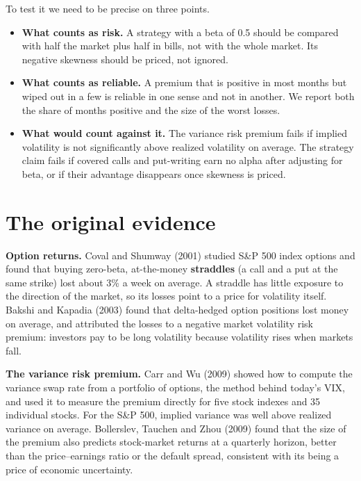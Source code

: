 To test it we need to be precise on three points.

\begin{itemize}
  \item \textbf{What counts as risk.} A strategy with a beta of 0.5 should be compared with half the market plus half in bills, not with the whole market. Its negative skewness should be priced, not ignored.
  \item \textbf{What counts as reliable.} A premium that is positive in most months but wiped out in a few is reliable in one sense and not in another. We report both the share of months positive and the size of the worst losses.
  \item \textbf{What would count against it.} The variance risk premium fails if implied volatility is not significantly above realized volatility on average. The strategy claim fails if covered calls and put-writing earn no alpha after adjusting for beta, or if their advantage disappears once skewness is priced.
\end{itemize}

\section{The original evidence}
\label{sec:14-evidence}

\textbf{Option returns.} Coval and Shumway (2001) studied S\&P 500 index options and found that buying zero-beta, at-the-money \textbf{straddles} (a call and a put at the same strike) lost about 3\% a week on average. A straddle has little exposure to the direction of the market, so its losses point to a price for volatility itself. Bakshi and Kapadia (2003) found that delta-hedged option positions lost money on average, and attributed the losses to a negative market volatility risk premium: investors pay to be long volatility because volatility rises when markets fall.

\textbf{The variance risk premium.} Carr and Wu (2009) showed how to compute the variance swap rate from a portfolio of options, the method behind today's VIX, and used it to measure the premium directly for five stock indexes and 35 individual stocks. For the S\&P 500, implied variance was well above realized variance on average. Bollerslev, Tauchen and Zhou (2009) found that the size of the premium also predicts stock-market returns at a quarterly horizon, better than the price--earnings ratio or the default spread, consistent with its being a price of economic uncertainty.

